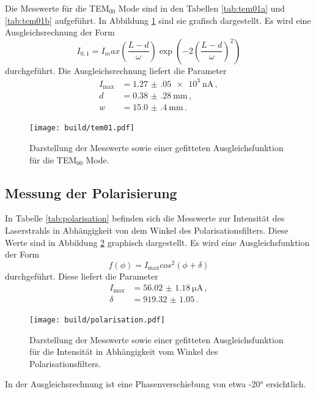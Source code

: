 Die Messwerte für die TEM$_{\mathrm{00}}$ Mode sind in den Tabellen \ref{tab:tem01a} und \ref{tab:tem01b} aufgeführt. In Abbildung \ref{fig:tem01} sind sie grafisch dargestellt. Es wird eine Ausgleichsrechnung
der Form
\begin{equation*}
  I_{0,1}=I_max\left(\frac{L-d}{\omega}\right) \exp\left(-2\left(\frac{L-d}{\omega}\right)^2\right)
\end{equation*}
durchgeführt.
Die Ausgleichsrechnung liefert die Parameter
\begin{align*}
  I_{\text{max}}&=\SI{1.27(05)e3}{\nano\ampere} \,,\\
  d&=\SI{0.38(28)}{\milli\metre} \,,\\
  w&=\SI{15.0(4)}{\milli\metre} \,.
\end{align*}

\begin{figure}
  \centering
  \texttt{[image: build/tem01.pdf]}
  \caption{Darstellung der Messwerte sowie einer gefitteten Ausgleichsfunktion für die TEM$_{\mathrm{00}}$ Mode.}
  \label{fig:tem01}
\end{figure}

\subsection{Messung der Polarisierung}
\label{subsec:polarisierung}

In Tabelle \ref{tab:polarisation} befinden sich die Messwerte zur Intensität des
Laserstrahls in Abhängigkeit von dem Winkel des Polarisationsfilters. Diese Werte
sind in Abbildung \ref{fig:polarisation} graphisch dargestellt. Es wird eine Ausgleichsfunktion der Form
\begin{equation*}
  f(\phi)=I_{\text{max}} cos^2(\phi+\delta)
\end{equation*}
durchgeführt. Diese liefert die Parameter
\begin{align*}
  I_{\text{max}}&=\SI{56.02(118)}{\micro\ampere} \,, \\
  \delta&=\SI{919.32(105)} \,.
\end{align*}

\begin{figure}
  \centering
  \texttt{[image: build/polarisation.pdf]}
  \caption{Darstellung der Messwerte sowie einer gefitteten Ausgleichsfunktion für die Intensität in
  Abhängigkeit vom Winkel des Polarisationsfilters.}
  \label{fig:polarisation}
\end{figure}

In der Ausgleichsrechnung ist eine Phasenverschiebung von etwa -20° ersichtlich.

